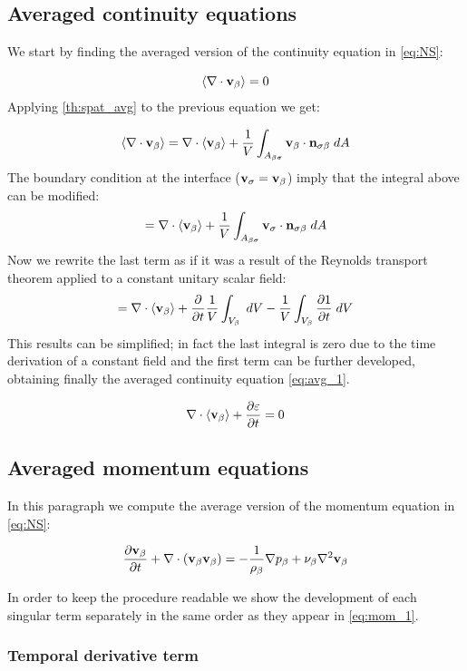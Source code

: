 \subsection{Averaged continuity equations}


We start by finding the averaged version of the continuity equation in \eqref{eq:NS}:

\begin{equation}
{\left< \nabla \cdot \textbf{v}_{\beta}\right>}   = 0
\label{eq:superf_avg_cont}
\end{equation}
Applying \ref{th:spat_avg} to the previous equation we get:

$$
{\left< \nabla \cdot \textbf{v}_{\beta} \right>} = \nabla \cdot {\left< \textbf{v}_{\beta}\right>} + \dfrac{1}{V} \int_{A_{\beta \sigma}}  \textbf{v}_{\beta} \cdot \mathbf{n}_{\sigma \beta} \;dA
$$
The boundary condition at the interface ($\textbf{v}_{\sigma} = \textbf{v}_{\beta}$) imply that the integral above can be modified: 
$$=\nabla \cdot {\left< \textbf{v}_{\beta}\right>} + \dfrac{1}{V} \int_{A_{\beta \sigma}}  \textbf{v}_{\sigma} \cdot \mathbf{n}_{\sigma \beta} \;dA$$
Now we rewrite the last term as if it was a result of the Reynolds transport theorem applied to a constant unitary scalar field:
$$=\nabla \cdot {\left< \textbf{v}_{\beta}\right>} + \dfrac{\partial }{\partial t} \dfrac{1}{V} \int_{V_\beta} \;dV  - \dfrac{1}{V} \int_{V_\beta} \dfrac{\partial 1}{\partial t} \;dV $$
This results can be simplified; in fact the last integral is zero due to the time derivation of a constant field and the first term can be further developed, obtaining finally the averaged continuity equation \eqref{eq:avg_1}.

\begin{equation}
\nabla \cdot {\left< \textbf{v}_{\beta}\right>} + \dfrac{\partial \varepsilon}{\partial t} =0
\label{eq:avg_1}
\end{equation}


\subsection{Averaged momentum equations}

In this paragraph we compute the average version of the momentum equation in \eqref{eq:NS}:

\begin{equation}
\dfrac{\partial \textbf{v}_{\beta}}{\partial t} + \nabla \cdot (\textbf{v}_{\beta}\textbf{v}_{\beta}) = -\frac{1}{\rho_{\beta}} \nabla p_{\beta} + \nu_{\beta} \nabla^2  \textbf{v}_{\beta}
\label{eq:mom_1}
\end{equation}

In order to keep the procedure readable we show the development of each singular term separately in the same order as they appear in \eqref{eq:mom_1}.

\subsubsection{Temporal derivative term}

